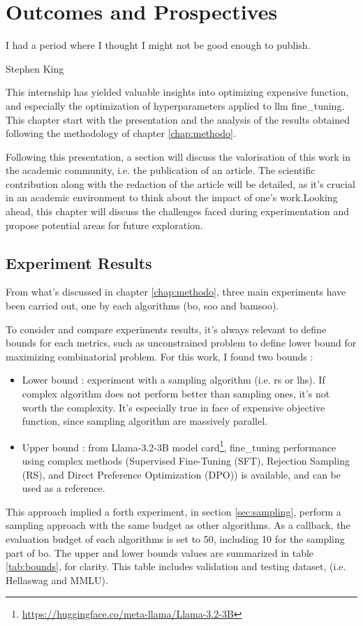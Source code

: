 \chapter{Outcomes and Prospectives}
\label{chap:outcomes}

\epigraph{I had a period where I thought I might not be good enough to publish.}{Stephen King}

This internship has yielded valuable insights into optimizing expensive function, and especially the optimization of hyperparameters applied to \acrshort{llm} \gls{fine_tuning}. This chapter start with the presentation and the analysis of the results obtained following the methodology of chapter \ref{chap:methodo}.

Following this presentation, a section will discuss the valorisation of this work in the academic community, i.e. the publication of an article. The scientific contribution along with the redaction of the article will be detailed, as it's crucial in an academic environment to think about the impact of one's work.Looking ahead, this chapter will discuss the challenges faced during experimentation and propose potential areas for future exploration. 



\section{Experiment Results}
\label{sec:exp_results}
From what's discussed in chapter \ref{chap:methodo}, three main experiments have been carried out, one by each algorithms (\acrshort{bo}, \acrshort{soo} and \acrshort{bamsoo}). 

To consider and compare experiments results, it's always relevant to define bounds for each metrics, such as unconstrained problem to define lower bound for maximizing combinatorial problem. For this work, I found two bounds : 
\begin{itemize}
    \item Lower bound : experiment with a sampling algorithm (i.e. \acrshort{rs} or \acrshort{lhs}). If complex algorithm does not perform better than sampling ones, it's not worth the complexity. It's especially true in face of expensive objective function, since sampling algorithm are massively parallel.
    \item Upper bound : from Llama-3.2-3B model card\footnote{\href{https://huggingface.co/meta-llama/Llama-3.2-3B}{https://huggingface.co/meta-llama/Llama-3.2-3B}}, \gls{fine_tuning} performance using complex methods (Supervised Fine-Tuning (SFT), Rejection Sampling (RS), and Direct Preference Optimization (DPO)) is available, and can be used as a reference.
\end{itemize}
This approach implied a forth experiment, in section \ref{sec:sampling}, perform a sampling approach with the same budget as other algorithms. As a callback, the evaluation budget of each algorithms is set to 50, including 10 for the sampling part of \acrshort{bo}. The upper and lower bounds values are summarized in table \ref{tab:bounds}, for clarity. This table includes validation and testing dataset, (i.e. Hellaswag and MMLU).


